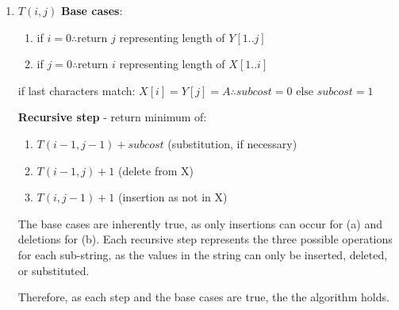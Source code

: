 \documentclass{article}
\begin{document}
\begin{enumerate}
    \item $T(i,j)$
        \textbf{Base cases}:
        \begin{enumerate}
            \item if $i = 0 \therefore \text{return } j $ representing length of $Y[1..j]$
            \item if $j = 0 \therefore \text{return } i $ representing length of $X[1..i]$
        \end{enumerate}

        if last characters match: $X[i] = Y[j] = A \therefore subcost = 0 \text{ else } subcost = 1$

        \textbf{Recursive step} - return minimum of:
        \begin{enumerate}
            \item $T(i-1, j-1) + subcost$ (substitution, if necessary)
            \item $T(i-1, j) + 1$ (delete from X)
            \item $T(i, j-1) + 1$ (insertion as not in X)
        \end{enumerate}
    
        The base cases are inherently true, as only insertions can occur for (a)
        and deletions for (b).
        Each recursive step represents the three possible operations for each sub-string,
        as the values in the string can only be inserted, deleted, or substituted.
        
        Therefore, as each step and the base cases are true, the the algorithm holds.


\end{enumerate}
\end{document}
